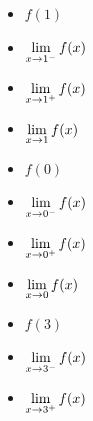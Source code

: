 \documentclass{ximera}
\begin{document}
\begin{example}
\begin{enumerate}
\begin{multicols}{4}
\begin{itemize}
 \end{itemize}
 
  \end{multicols}
 
\smallskip
 
  \begin{multicols}{4}
 
 \begin{itemize}
 
 \item $f(1)$
 
 \item  $\ds{ \lim_{x \rightarrow 1^{-}} f(x)}$
 
  \item  $\ds{ \lim_{x \rightarrow 1^{+}} f(x)}$
 
   \item  $\ds{ \lim_{x \rightarrow 1} f(x)}$
 
 \end{itemize}
 
  \end{multicols}
 
\smallskip
 
 \begin{multicols}{4}
 
 \begin{itemize}
 
 \item $f(0)$
 
 \item  $\ds{ \lim_{x \rightarrow 0^{-}} f(x)}$
 
  \item  $\ds{ \lim_{x \rightarrow 0^{+}} f(x)}$
 
  \item  $\ds{ \lim_{x \rightarrow 0} f(x)}$
 
 \end{itemize}
 
  \end{multicols}
 
\smallskip
 
  \begin{multicols}{4}
 
 \begin{itemize}
 
 \item $f(3)$
 
 \item  $\ds{ \lim_{x \rightarrow 3^{-}} f(x)}$
 
  \item  $\ds{ \lim_{x \rightarrow 3^{+}} f(x)}$
 

\end{itemize}
\end{multicols}
\end{enumerate}
\end{example}
\end{document}
